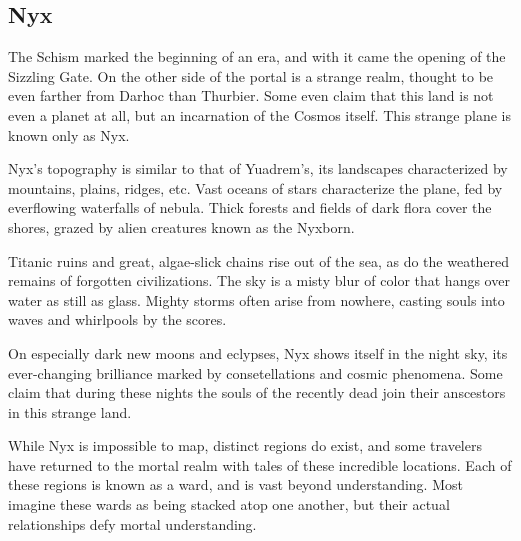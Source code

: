 %

\subsection*{Nyx}
The Schism marked the beginning of an era, and with it came the opening of the Sizzling Gate.
On the other side of the portal is a strange realm, thought to be even farther from Darhoc than Thurbier.
Some even claim that this land is not even a planet at all, but an incarnation of the Cosmos itself.
This strange plane is known only as Nyx.

Nyx's topography is similar to that of Yuadrem's, its landscapes characterized by mountains, plains, ridges, etc.
Vast oceans of stars characterize the plane, fed by everflowing waterfalls of nebula.
Thick forests and fields of dark flora cover the shores, grazed by alien creatures known as the Nyxborn.

Titanic ruins and great, algae-slick chains rise out of the sea, as do the weathered remains of forgotten civilizations.
The sky is a misty blur of color that hangs over water as still as glass.
Mighty storms often arise from nowhere, casting souls into waves and whirlpools by the scores.

On especially dark new moons and eclypses, Nyx shows itself in the night sky, its ever-changing brilliance marked by consetellations and cosmic phenomena.
Some claim that during these nights the souls of the recently dead join their anscestors in this strange land.

While Nyx is impossible to map, distinct regions do exist, and some travelers have returned to the mortal realm with tales of these incredible locations.
Each of these regions is known as a ward, and is vast beyond understanding.
Most imagine these wards as being stacked atop one another, but their actual relationships defy mortal understanding.

